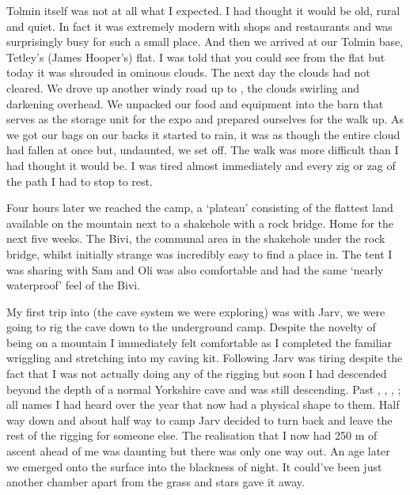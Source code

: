 Tolmin itself was not at all what I expected. I had thought it would be old, rural and quiet. In fact it was extremely modern with shops and restaurants and was surprisingly busy for such a small place. And then we arrived at our Tolmin base, Tetley’s (James Hooper’s) flat. I was told that you could see  from the flat but today it was shrouded in ominous clouds. The next day the clouds had not cleared. We drove up another windy road up to , the clouds swirling and darkening overhead. We unpacked our food and equipment into the barn that serves as the storage unit for the expo and prepared ourselves for the walk up. As we got our bags on our backs it started to rain, it was as though the entire cloud had fallen at once but, undaunted, we set off. The walk was more difficult than I had thought it would be. I was tired almost immediately and every zig or zag of the path I had to stop to rest.

Four hours later we reached the camp, a ‘plateau’ consisting of the flattest land available on the mountain next to a shakehole with a rock bridge. Home for the next five weeks. The Bivi, the communal area in the shakehole under the rock bridge, whilst initially strange was incredibly easy to find a place in. The tent I was sharing with Sam and Oli was also comfortable and had the same ‘nearly waterproof’ feel of the Bivi.

My first trip into  (the cave system we were exploring) was with Jarv, we were going to rig the cave down to the underground camp. Despite the novelty of being on a mountain I immediately felt comfortable as I completed the familiar wriggling and stretching into my caving kit. Following Jarv was tiring despite the fact that I was not actually doing any of the rigging but soon I had descended beyond the depth of a normal Yorkshire cave and was still descending. Past , , , ; all names I had heard over the year that now had a physical shape to them. Half way down  and about half way to camp Jarv decided to turn back and leave the rest of the rigging for someone else. The realisation that I now had 250 m of ascent ahead of me was daunting but there was only one way out. An age later we emerged onto the surface into the blackness of night. It could’ve been just another chamber apart from the grass and stars gave it away.

